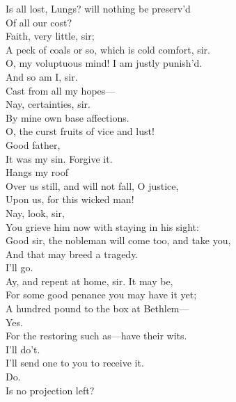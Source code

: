 \documentclass[a4paper,oneside]{memoir}
\begin{document}
\begin{drama*}
\mammonspeaks Is all lost, Lungs? will nothing be preserv'd\\
Of all our cost?\\
\facespeaks {} Faith, very little, sir;\\
A peck of coals or so, which is cold comfort, sir.\\
\mammonspeaks O, my voluptuous mind! I am justly punish'd.\\
\facespeaks And so am I, sir.\\
\mammonspeaks {} Cast from all my hopes---\\
\facespeaks Nay, certainties, sir.\\
\mammonspeaks {} By mine own base affections.\\
\subtlespeaks {}
O, the curst fruits of vice and lust!\\
\mammonspeaks {} Good father,\\
It was my sin. Forgive it.\\
\subtlespeaks {} Hangs my roof\\
Over us still, and will not fall, O justice,\\
Upon us, for this wicked man!\\
\facespeaks {} Nay, look, sir,\\
You grieve him now with staying in his sight:\\
Good sir, the nobleman will come too, and take you,\\
And that may breed a tragedy.\\
\mammonspeaks {} I'll go.\\
\facespeaks Ay, and repent at home, sir. It may be,\\
For some good penance you may have it yet;\\
A hundred pound to the box at Bethlem---\\
\mammonspeaks Yes.\\
\facespeaks {} For the restoring such as---have their wits.\\
\mammonspeaks I'll do't.\\
\facespeaks {} I'll send one to you to receive it.\\
\mammonspeaks Do.\\
Is no projection left?\\

\end{drama*}
\end{document}
